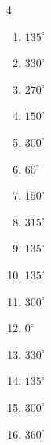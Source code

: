 \begin{multicols}{4}
\begin{enumerate}
  \item $\displaystyle 135^{\circ}$

  \item $\displaystyle 330^{\circ}$

  \item $\displaystyle 270^{\circ}$

  \item $\displaystyle 150^{\circ}$

  \item $\displaystyle 300^{\circ}$

  \item $\displaystyle 60^{\circ}$

  \item $\displaystyle 150^{\circ}$

  \item $\displaystyle 315^{\circ}$

  \item $\displaystyle 135^{\circ}$

  \item $\displaystyle 135^{\circ}$

  \item $\displaystyle 300^{\circ}$

  \item $\displaystyle 0^{\circ}$
        \phantom{$\displaystyle =0$}

  \item $\displaystyle 330^{\circ}$

  \item $\displaystyle 135^{\circ}$

  \item $\displaystyle 300^{\circ}$

  \item $\displaystyle 360^{\circ}$
        \phantom{$\displaystyle =2\pi$}


\end{enumerate}
\end{multicols}
